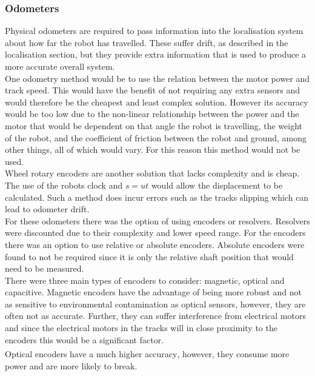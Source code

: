 \documentclass[11pt]{article}		%
\newcommand{\supercite}[1]{\textsuperscript{\cite{#1}}}		%
\begin{document}
        \subsubsection{Odometers}
        
	        Physical odometers are required to pass information into the localisation system about how far the robot has travelled.
	        These suffer drift, as described in the localisation section, but they provide extra information that is used to produce a more accurate overall system.
	        \\
	        One odometry method would be to use the relation between the motor power and track speed.
	        This would have the benefit of not requiring any extra sensors and would therefore be the cheapest and least complex solution.
	        However its accuracy would be too low due to the non-linear relationship between the power and the motor that would be dependent on that angle the robot is travelling, the weight of the robot, and the coefficient of friction between the robot and ground, among other things, all of which would vary.
	        For this reason this method would not be used.
	        \\
	        Wheel rotary encoders are another solution that lacks complexity and is cheap.
	        The use of the robots clock and $s=ut$ would allow the displacement to be calculated. 
	        Such a method does incur errors such as the tracks slipping which can lead to odometer drift.
	        \\
	        For these odometers there was the option of using encoders or resolvers.
	        Resolvers were discounted due to their complexity and lower speed range.
	        For the encoders there was an option to use relative or absolute encoders. 
	        Absolute encoders were found to not be required since it is only the relative shaft position that would need to be measured.
	        \\
	        There were three main types of encoders to consider: magnetic, optical and capacitive.
	        Magnetic encoders have the advantage of being more robust and not as sensitive to environmental contamination as optical sensors, however, they are often not as accurate. 
	        Further, they can suffer interference from electrical motors and since the electrical motors in the tracks will in close proximity to the encoders this would be a significant factor. 
	        \\
	        Optical encoders have a much higher accuracy\supercite{Encoders}, however, they consume more power and are more likely to break. 
\end{document}
